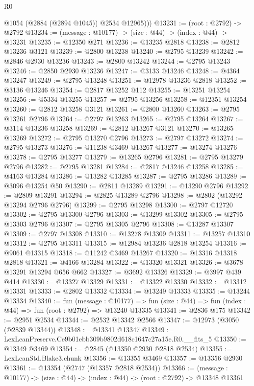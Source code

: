 \begin{lexlean}{R0}
\begin{coremodule}
          @1054
          (@2884 (@2894 @1045))
          @2534
          @12965)))
@13231 := (root : @2792) -> @2792
@13234 := (message : @10177) -> (size : @44) -> (index : @44) -> @13231
@13235 := @12350 @271
@13236 := @13235 @2818
@13238 := @2812 @13236 @3121
@13239 := @2800 @13238
@13240 := @2795 @13239
@13242 := @2846 @2930 @13236
@13243 := @2800 @13242
@13244 := @2795 @13243
@13246 := @2850 @2930 @13236
@13247 := @3133 @13246
@13248 := @4364 @13247
@13249 := @2795 @13248
@13251 := @12978 @13236 @2818
@13252 := @3136 @13246
@13254 := @2817 @13252 @112
@13255 := @13251 @13254
@13256 := @5334 @13255
@13257 := @2795 @13256
@13258 := @12351 @13254
@13260 := @2812 @13258 @3121
@13261 := @2800 @13260
@13263 := @2795 @13261 @2796
@13264 := @2797 @13263
@13265 := @2795 @13264
@13267 := @3114 @13236 @13258
@13269 := @2812 @13267 @3121
@13270 := @13265 @13269
@13272 := @2795 @13270 @2796
@13273 := @2797 @13272
@13274 := @2795 @13273
@13276 := @11238 @3469 @13267
@13277 := @13274 @13276
@13278 := @2795 @13277
@13279 := @13265 @2796
@13281 := @2795 @13279 @2796
@13282 := @2795 @13281
@13284 := @2817 @13246 @13258
@13285 := @4163 @13284
@13286 := @13282 @13285
@13287 := @2795 @13286
@13289 := @3096 @13254 @50
@13290 := @2811 @13289
@13291 := @13290 @2796
@13292 := @2809 @13291
@13294 := @2825 @13289 @2796
@13298 := @2802 (@13292 @13294 @2796 @2796)
@13299 := @2795 @13298
@13300 := @2797 @12720
@13302 := @2795 @13300 @2796
@13303 := @13299 @13302
@13305 := @2795 @13303 @2796
@13307 := @2795 @13305 @2796
@13308 := @13287 @13307
@13309 := @2797 @13308
@13310 := @13278 @13309
@13311 := @13257 @13310
@13312 := @2795 @13311
@13315 := @12984 @13236 @2818 @13254
@13316 := @9061 @13315
@13318 := @11242 @3469 @13267
@13320 := @13316 @13318 @2818
@13321 := @4166 @13284
@13322 := @13320 @13321
@13326 := @3678 @13291 @13294 @656 @662
@13327 := @3692 @13326
@13329 := @3997 @439 @414
@13330 := @13327 @13329
@13331 := @13322 @13330
@13332 := @13312 @13331
@13333 := @2802 @13332
@13334 := @13249 @13333
@13335 := @13244 @13334
@13340 := fun (message : @10177) =>
  fun (size : @44) => fun (index : @44) => fun (root : @2792) => @13240 @13335
@13341 := @2836 @175
@13342 := @2951 @2534
@13344 := @2532 @13342 @2566
@13347 := @12973 (@3050 (@2839 @13344))
@13348 := @13341 @13347
@13349 := LexLeanPreserve.Ce9b01ebb309b9802d618c1647c27a15e.R0.__fits_5
@13350 := @13349 @3469
@13354 := @2845 (@13350 @2930 @2818 @2534)
@13355 := LexLeanStd.Blake3.chunk
@13356 := @13355 @3469
@13357 := @13356 @2930
@13361 := @13354 (@2747 (@13357 @2818 @2534))
@13366 := (message : @10177) -> (size : @44) -> (index : @44) -> (root : @2792) -> @13348 @13361

\end{coremodule}
\end{lexlean}
